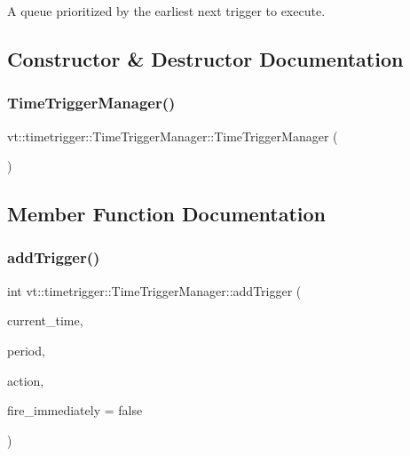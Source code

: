 A queue prioritized by the earliest next trigger to execute. 



\subsection{Constructor \& Destructor Documentation}
\mbox{\label{structvt_1_1timetrigger_1_1_time_trigger_manager_a5739a97e0a8c7a19943d030a04e63a35}} 
\subsubsection{\texorpdfstring{Time\+Trigger\+Manager()}{TimeTriggerManager()}}
{\footnotesize\ttfamily vt\+::timetrigger\+::\+Time\+Trigger\+Manager\+::\+Time\+Trigger\+Manager (\begin{DoxyParamCaption}{ }\end{DoxyParamCaption})\hspace{0.3cm}{\ttfamily [default]}}



\subsection{Member Function Documentation}
\mbox{\label{structvt_1_1timetrigger_1_1_time_trigger_manager_a42729a0a83f734dad3ef6d95b5afb3d9}} 
\subsubsection{\texorpdfstring{add\+Trigger()}{addTrigger()}}
{\footnotesize\ttfamily int vt\+::timetrigger\+::\+Time\+Trigger\+Manager\+::add\+Trigger (\begin{DoxyParamCaption}\item[{\hyperlink{namespacevt_a876a9d0cd5a952859c72de8a46881442}{Time\+Type}}]{current\+\_\+time,  }\item[{std\+::chrono\+::milliseconds}]{period,  }\item[{\hyperlink{namespacevt_ae0a5a7b18cc99d7b732cb4d44f46b0f3}{Action\+Type}}]{action,  }\item[{bool}]{fire\+\_\+immediately = {\ttfamily false} }\end{DoxyParamCaption})}



